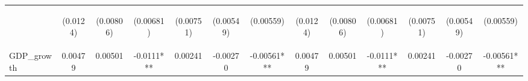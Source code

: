 \documentclass[]{article}
\begin{document}
\begin{center}
\begin{tabular}{lcccccccccccc}
\vspace{4pt} & \begin{footnotesize}(0.0124)\end{footnotesize} & \begin{footnotesize}(0.00806)\end{footnotesize} & \begin{footnotesize}(0.00681)\end{footnotesize} & \begin{footnotesize}(0.00751)\end{footnotesize} & \begin{footnotesize}(0.00549)\end{footnotesize} & \begin{footnotesize}(0.00559)\end{footnotesize} & \begin{footnotesize}(0.0124)\end{footnotesize} & \begin{footnotesize}(0.00806)\end{footnotesize} & \begin{footnotesize}(0.00681)\end{footnotesize} & \begin{footnotesize}(0.00751)\end{footnotesize} & \begin{footnotesize}(0.00549)\end{footnotesize} & \begin{footnotesize}(0.00559)\end{footnotesize} \\
GDP\_growth & 0.00479 & 0.00501 & -0.0111*** & 0.00241 & -0.00270 & -0.00561*** & 0.00479 & 0.00501 & -0.0111*** & 0.00241 & -0.00270 & -0.00561*** \\

\end{tabular}
\end{center}
\end{document}
